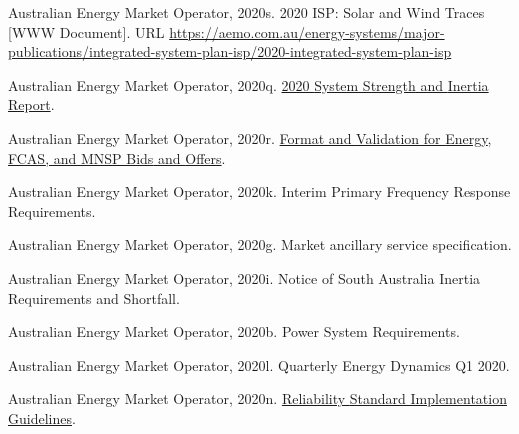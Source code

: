 \documentclass[12pt,a4paper,]{report}
\newlength{\cslhangindent}
\newenvironment{CSLReferences}[2] %
 {%
  \setlength{\parindent}{0pt}
  \ifodd #1 \everypar{\setlength{\hangindent}{\cslhangindent}}\ignorespaces\fi
  \ifnum #2 > 0
  \setlength{\parskip}{#2\baselineskip}
  \fi
 }%
 {}
\begin{document}
\begin{CSLReferences}{1}{0}
\leavevmode{}%
Australian Energy Market Operator, 2020s. 2020 {ISP}: {Solar} and {Wind
Traces} {[}WWW Document{]}. URL
\url{https://aemo.com.au/energy-systems/major-publications/integrated-system-plan-isp/2020-integrated-system-plan-isp}

\leavevmode{}%
Australian Energy Market Operator, 2020q.
\href{https://www.aemo.com.au/-/media/files/electricity/nem/planning_and_forecasting/Operability/2020/2020-System-Strength-and-Inertia-Report\#:~:text=previously\%20declared\%20system\%20strength\%20and\%20inertia\%20shortfalls&text=The\%20inertia\%20requirements\%20include\%20the,when\%20a\%20reg}{2020
{System Strength} and {Inertia Report}}.

\leavevmode{}%
Australian Energy Market Operator, 2020r.
\href{https://www.aemo.com.au/-/media/Files/Electricity/NEM/5MS/Systems-Workstream/2019/Format-and-Validation-for-Energy-FCAS-and-MNSP-Bids-and-Offers.pdf}{Format
and {Validation} for {Energy}, {FCAS}, and {MNSP Bids} and {Offers}}.

\leavevmode{}%
Australian Energy Market Operator, 2020k. Interim {Primary Frequency
Response Requirements}.

\leavevmode{}%
Australian Energy Market Operator, 2020g. Market ancillary service
specification.

\leavevmode{}%
Australian Energy Market Operator, 2020i. Notice of {South Australia
Inertia Requirements} and {Shortfall}.

\leavevmode{}%
Australian Energy Market Operator, 2020b. Power {System Requirements}.

\leavevmode{}%
Australian Energy Market Operator, 2020l. Quarterly {Energy Dynamics Q1}
2020.

\leavevmode{}%
Australian Energy Market Operator, 2020n.
\href{https://aemo.com.au/-/media/files/electricity/nem/planning_and_forecasting/rsig/reliability-standard-implementation-guidelines.pdf?la=en}{Reliability
{Standard Implementation Guidelines}}.


\end{CSLReferences}
\end{document}
